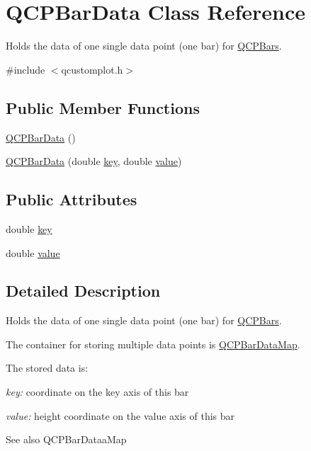 \hypertarget{classQCPBarData}{}\section{Q\+C\+P\+Bar\+Data Class Reference}
\label{classQCPBarData}


Holds the data of one single data point (one bar) for \hyperlink{classQCPBars}{Q\+C\+P\+Bars}.  




{\ttfamily \#include $<$qcustomplot.\+h$>$}

\subsection*{Public Member Functions}
\begin{DoxyCompactItemize}
\item 
\hyperlink{classQCPBarData_a8d214eda9ef41bc6da2a908a09623836}{Q\+C\+P\+Bar\+Data} ()
\item 
\hyperlink{classQCPBarData_ac0bb7ede5373a7b18713418fa78f972d}{Q\+C\+P\+Bar\+Data} (double \hyperlink{classQCPBarData_afe544b035ef19027ea3d65adeaf81b42}{key}, double \hyperlink{classQCPBarData_acab57005d8916d61b64e9ddef6113b60}{value})
\end{DoxyCompactItemize}
\subsection*{Public Attributes}
\begin{DoxyCompactItemize}
\item 
double \hyperlink{classQCPBarData_afe544b035ef19027ea3d65adeaf81b42}{key}
\item 
double \hyperlink{classQCPBarData_acab57005d8916d61b64e9ddef6113b60}{value}
\end{DoxyCompactItemize}


\subsection{Detailed Description}
Holds the data of one single data point (one bar) for \hyperlink{classQCPBars}{Q\+C\+P\+Bars}. 

The container for storing multiple data points is \hyperlink{qcustomplot_8h_aa846c77472cae93def9f1609d0c57191}{Q\+C\+P\+Bar\+Data\+Map}.

The stored data is\+: \begin{DoxyItemize}
\item {\itshape key\+:} coordinate on the key axis of this bar \item {\itshape value\+:} height coordinate on the value axis of this bar\end{DoxyItemize}
\begin{DoxySeeAlso}{See also}
Q\+C\+P\+Bar\+Dataa\+Map 
\end{DoxySeeAlso}


